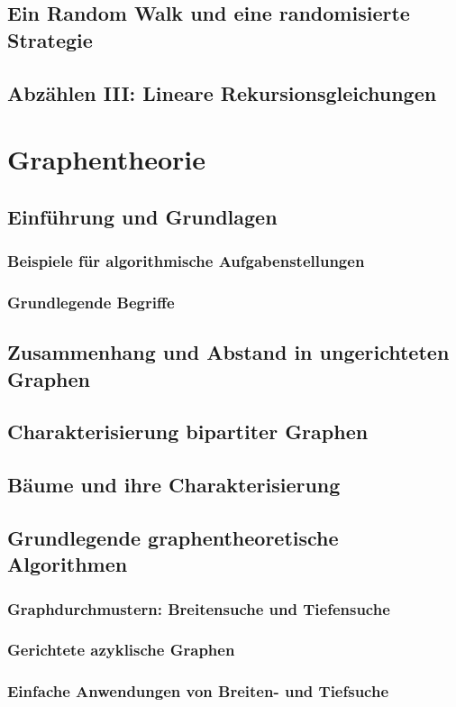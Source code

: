 \subsection{Ein Random Walk und eine randomisierte Strategie}
\subsection{Abzählen III: Lineare Rekursionsgleichungen}
%
%
%
\section{Graphentheorie}

\subsection{Einführung und Grundlagen}
\subsubsection{Beispiele für algorithmische Aufgabenstellungen}
\subsubsection{Grundlegende Begriffe}
\subsection{Zusammenhang und Abstand in ungerichteten Graphen}
\subsection{Charakterisierung bipartiter Graphen}
\subsection{Bäume und ihre Charakterisierung}
\subsection{Grundlegende graphentheoretische Algorithmen}
\subsubsection{Graphdurchmustern: Breitensuche und Tiefensuche}
\subsubsection{Gerichtete azyklische Graphen}
\subsubsection{Einfache Anwendungen von Breiten- und Tiefsuche}
